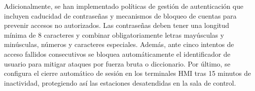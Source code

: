 Adicionalmente, se han implementado políticas de gestión de autenticación que incluyen caducidad de contraseñas y mecanismos de bloqueo de cuentas para prevenir accesos no autorizados. Las contraseñas deben tener una longitud mínima de 8 caracteres y combinar obligatoriamente letras mayúsculas y minúsculas, números y caracteres especiales. Además, ante cinco intentos de acceso fallidos consecutivos se bloquea automáticamente el identificador de usuario para mitigar ataques por fuerza bruta o diccionario. Por último, se configura el cierre automático de sesión en los terminales \ac{HMI} tras 15 minutos de inactividad, protegiendo así las estaciones desatendidas en la sala de control.